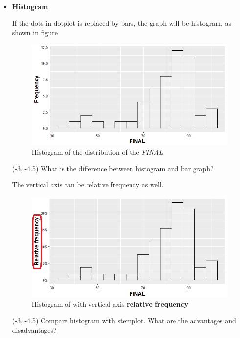 \documentclass[a4paper, 12pt,twoside]{book}
\begin{document}
\begin{itemize}
\item \textbf{Histogram}\vspace{0.3cm}

If the dots in dotplot is replaced by bars, the graph will be histogram, as shown in figure 

\begin{figure}[H]
\centering
\includegraphics[scale=0.4]{Histogram1.png}
\caption{Histogram of the distribution of the \textit{FINAL}}
\label{HistogramFrequency}
\end{figure}

\begin{textblock}{4.8}(-3, -4.5)
 What is the difference between histogram and bar graph?
 \end{textblock}
 
The vertical axis can be relative frequency as well.
\begin{figure}[H]
\centering
\includegraphics[scale=0.4]{Histogram2.png}
\caption{Histogram of with vertical axis \textbf{relative frequency}}
\label{HistogramRelativeFrequency}
\end{figure}


 
\begin{textblock}{4.8}(-3, -4.5) 
   Compare histogram with stemplot. What are the advantages and disadvantages? 
 \end{textblock}



\end{itemize}
\end{document}
